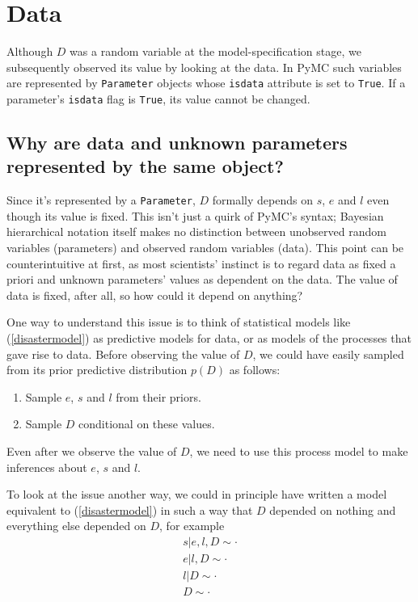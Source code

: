 \section{Data}

Although $D$ was a random variable at the model-specification stage, we subsequently observed its value by looking at the data. In PyMC such variables are represented by \texttt{Parameter} objects whose \texttt{isdata} attribute is set to \texttt{True}. If a parameter's \texttt{isdata} flag is \texttt{True}, its value cannot be changed.

\subsection{Why are data and unknown parameters represented by the same object?}
Since it's represented by a \texttt{Parameter}, $D$ formally depends on $s$, $e$ and $l$ even though its value is fixed. This isn't just a quirk of PyMC's syntax; Bayesian hierarchical notation itself makes no distinction between unobserved random variables (parameters) and observed random variables (data). This point can be counterintuitive at first, as most scientists' instinct is to regard data as fixed a priori and unknown parameters' values as dependent on the data. The value of data is fixed, after all, so how could it depend on anything?

One way to understand this issue is to think of statistical models like (\ref{disastermodel}) as predictive models for data, or as models of the processes that gave rise to data. Before observing the value of $D$, we could have easily sampled from its prior predictive distribution $p(D)$ as follows:
\begin{enumerate}
    \item Sample $e$, $s$ and $l$ from their priors.
    \item Sample $D$ conditional on these values.
\end{enumerate}
Even after we observe the value of $D$, we need to use this process model to make inferences about $e$, $s$ and $l$.

\medskip
To look at the issue another way, we could in principle have written a model equivalent to (\ref{disastermodel}) in such a way that $D$ depended on nothing and everything else depended on $D$, for example
\begin{eqnarray*}
    s|e,l,D\sim\cdot\\
    e|l,D\sim\cdot\\
    l|D\sim\cdot\\
    D\sim\cdot
\end{eqnarray*}

